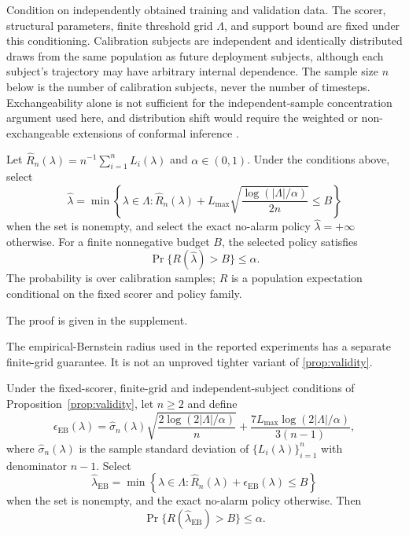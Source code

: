 Condition on independently obtained training and validation data. The scorer, structural parameters, finite threshold grid $\Lambda$, and support bound are fixed under this conditioning. Calibration subjects are independent and identically distributed draws from the same population as future deployment subjects, although each subject's trajectory may have arbitrary internal dependence. The sample size $n$ below is the number of calibration subjects, never the number of timesteps. Exchangeability alone is not sufficient for the independent-sample concentration argument used here, and distribution shift would require the weighted or non-exchangeable extensions of conformal inference \citep{barber2023conformal}.

\begin{proposition}
\label{prop:validity}
Let $\widehat R_n(\lambda)=n^{-1}\sum_{i=1}^nL_i(\lambda)$ and $\alpha\in(0,1)$. Under the conditions above, select
\begin{equation}
\label{eq:lambda}
\widehat\lambda=\min\left\{\lambda\in\Lambda:
\widehat R_n(\lambda)+L_{\max}\sqrt{\frac{\log(|\Lambda|/\alpha)}{2n}}\le B\right\}
\end{equation}
when the set is nonempty, and select the exact no-alarm policy $\widehat\lambda=+\infty$ otherwise. For a finite nonnegative budget $B$, the selected policy satisfies
\begin{equation}
\label{eq:bound}
\Pr\{R(\widehat\lambda)>B\}\le\alpha.
\end{equation}
The probability is over calibration samples; $R$ is a population expectation conditional on the fixed scorer and policy family.
\end{proposition}

The proof is given in the supplement.

The empirical-Bernstein radius used in the reported experiments has a separate finite-grid guarantee. It is not an unproved tighter variant of \cref{prop:validity}.

\begin{proposition}
\label{prop:eb}
Under the fixed-scorer, finite-grid and independent-subject conditions of Proposition~\ref{prop:validity}, let $n\ge2$ and define
\begin{equation}
\label{eq:bernstein}
\epsilon_{\mathrm{EB}}(\lambda)=\widehat\sigma_n(\lambda)
 \sqrt{\frac{2\log(2|\Lambda|/\alpha)}{n}}
 +\frac{7L_{\max}\log(2|\Lambda|/\alpha)}{3(n-1)},
\end{equation}
where $\widehat\sigma_n(\lambda)$ is the sample standard deviation of $\{L_i(\lambda)\}_{i=1}^n$ with denominator $n-1$. Select
\begin{equation}
\label{eq:lambda-eb}
\widehat\lambda_{\mathrm{EB}}=\min\left\{\lambda\in\Lambda:
\widehat R_n(\lambda)+\epsilon_{\mathrm{EB}}(\lambda)\le B\right\}
\end{equation}
when the set is nonempty, and the exact no-alarm policy otherwise. Then
\begin{equation}
\label{eq:bound-eb}
\Pr\{R(\widehat\lambda_{\mathrm{EB}})>B\}\le\alpha.
\end{equation}
\end{proposition}


